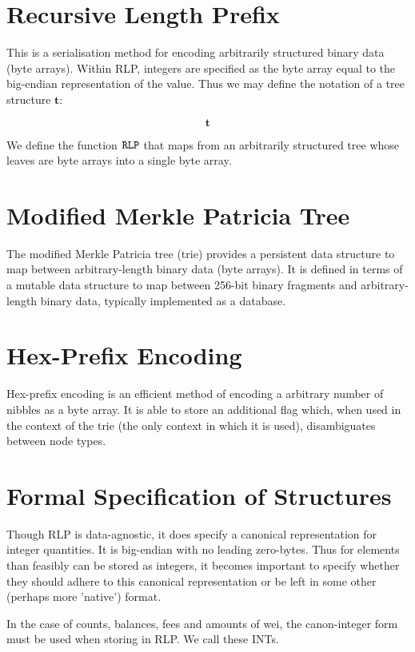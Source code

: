 \documentclass[9pt,oneside]{amsart}
\begin{document}
\section{Recursive Length Prefix}\label{app:rlp}
This is a serialisation method for encoding arbitrarily structured binary data (byte arrays). Within RLP, integers are specified as the byte array equal to the big-endian representation of the value. Thus we may define the notation of a tree structure $\mathbf{t}$:

\begin{equation}
\mathbf{t}
\end{equation}

We define the function $\mathtt{\tiny RLP}$ that maps from an arbitrarily structured tree whose leaves are byte arrays into a single byte array. 

\section{Modified Merkle Patricia Tree}\label{app:trie}
The modified Merkle Patricia tree (trie) provides a persistent data structure to map between arbitrary-length binary data (byte arrays). It is defined in terms of a mutable data structure to map between 256-bit binary fragments and arbitrary-length binary data, typically implemented as a database.

\section{Hex-Prefix Encoding}\label{app:hexprefix}
Hex-prefix encoding is an efficient method of encoding a arbitrary number of nibbles as a byte array. It is able to store an additional flag which, when used in the context of the trie (the only context in which it is used), disambiguates between node types.

\section{Formal Specification of Structures}
Though RLP is data-agnostic, it does specify a canonical representation for integer quantities. It is big-endian with no leading zero-bytes. Thus for elements than feasibly can be stored as integers, it becomes important to specify whether they should adhere to this canonical representation or be left in some other (perhaps more 'native') format.

In the case of counts, balances, fees and amounts of wei, the canon-integer form must be used when storing in RLP. We call these INTs.
\end{document}
